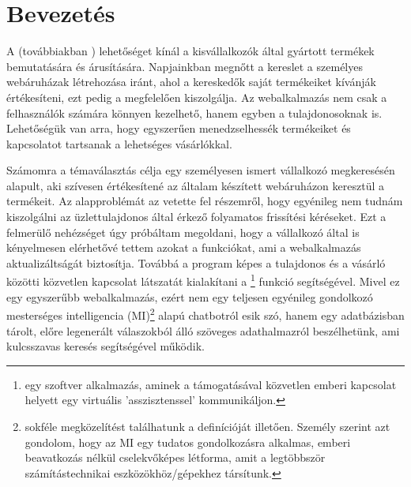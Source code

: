 \chapter{Bevezetés} %
\label{ch:intro}

A \citeauthor{WebBeauty} (továbbiakban \citeauthor{WB}) lehetőséget kínál a kisvállalkozók által gyártott termékek bemutatására és árusítására. Napjainkban megnőtt a kereslet a személyes webáruházak létrehozása iránt, ahol a kereskedők saját termékeiket kívánják értékesíteni, ezt pedig a \citeauthor{WB} megfelelően kiszolgálja. Az webalkalmazás nem csak a felhasználók számára könnyen kezelhető, hanem egyben a tulajdonosoknak is. Lehetőségük van arra, hogy egyszerűen menedzselhessék termékeiket és kapcsolatot tartsanak a lehetséges vásárlókkal.

Számomra a témaválasztás célja egy személyesen ismert vállalkozó megkeresésén alapult, aki szívesen értékesítené az általam készített webáruházon keresztül a termékeit. Az alapproblémát az vetette fel részemről, hogy egyénileg nem tudnám kiszolgálni az üzlettulajdonos által érkező folyamatos frissítési kéréseket. Ezt a felmerülő nehézséget úgy próbáltam megoldani, hogy a vállalkozó által is kényelmesen elérhetővé tettem azokat a funkciókat, ami a webalkalmazás aktualizáltságát biztosítja. Továbbá a program képes a tulajdonos és a vásárló közötti közvetlen kapcsolat látszatát kialakítani a \citeauthor{chatbot}\footnote{egy szoftver alkalmazás, aminek a támogatásával közvetlen emberi kapcsolat helyett egy virtuális ’asszisztenssel’ kommunikáljon.} funkció segítségével. Mivel ez egy egyszerűbb webalkalmazás, ezért nem egy teljesen egyénileg gondolkozó mesterséges intelligencia (MI)\footnote{sokféle megközelítést találhatunk a definícióját illetően. Személy szerint azt gondolom, hogy az MI egy tudatos gondolkozásra alkalmas, emberi beavatkozás nélkül cselekvőképes létforma, amit a legtöbbször számítástechnikai eszközökhöz/gépekhez társítunk.} alapú chatbotról esik szó, hanem egy adatbázisban tárolt, előre legenerált válaszokból álló szöveges adathalmazról beszélhetünk, ami kulcsszavas keresés segítségével működik.
